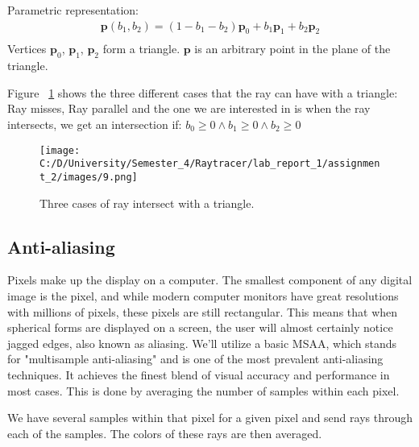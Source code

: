 \documentclass{article}
\begin{document}
	Parametric representation:
	\begin{equation}
		\begin{split}
			\pmb{p}(b_1,b_2) = (1 - b_1 - b_2)\pmb{p}_0 + b_1\pmb{p}_1 + b_2\pmb{p}_2\\
		\end{split}		
	\end{equation}
	Vertices $\pmb{p}_0$, $\pmb{p}_1$, $\pmb{p}_2$ form a triangle. $\pmb{p}$ is an arbitrary point in the plane
	of the triangle.
	
	Figure ~\ref{fig:3} shows the three different cases that the ray can have with a triangle: Ray misses, Ray parallel and the one we are interested in is when the ray intersects, we get an intersection if: 
	\( b_0 \geq
	0 \land b_1\geq
	0 \land b_2 \geq
	0 \)
	
	
	
	\begin{figure}[H]
		\begin{center}
			\texttt{[image: C:/D/University/Semester\_4/Raytracer/lab\_report\_1/assignment\_2/images/9.png]}
			
			\caption{Three cases of ray intersect with a triangle.}
			\label{fig:3}
		\end{center}
	\end{figure}
	
	\subsection{Anti-aliasing}
	Pixels make up the display on a computer. The smallest component of any digital image is the pixel, and while modern computer monitors have great resolutions with millions of pixels, these pixels are still rectangular. This means that when spherical forms are displayed on a screen, the user will almost certainly notice jagged edges, also known as aliasing.
	We'll utilize a basic MSAA, which stands for "multisample anti-aliasing" and is one of the most prevalent anti-aliasing techniques. It achieves the finest blend of visual accuracy and performance in most cases. This is done by averaging the number of samples within each pixel.
	
	We have several samples within that pixel for a given pixel and send rays through each of the samples. The colors of these rays are then averaged.
	
\end{document}
